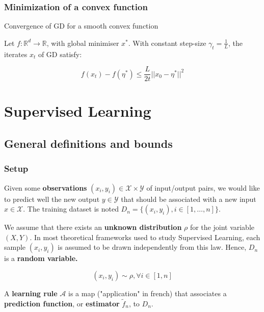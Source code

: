 \documentclass[
10pt, %
a4paper, %
oneside, %
headinclude,footinclude, %
BCOR5mm, %
]{scrartcl}
\begin{document}
\subsubsection{\large\color{Periwinkle}Minimization of a convex function}

\begin{theorem}{Convergence of GD for a smooth convex function}

    Let $f: \mathbb{R}^d\rightarrow \mathbb{R} $, with global minimiser $x^*$.
    With constant step-size $\gamma_t = \frac{1}{L} $, the iterates $x_t$ of GD
    satisfy:

    \begin{equation*}
	f(x_t)-f(\eta^*)\leq \frac{L}{2t} ||x_0-\eta^*||^2
    \end{equation*}
\end{theorem}


\section{\large\color{Blue}Supervised Learning}

\subsection{\large\color{MidnightBlue}General definitions and bounds}

\subsubsection{\large\color{Periwinkle}Setup}

Given some \textbf{{observations}} $(x_i,y_i)\in \mathcal{X} \times \mathcal{Y}$ of input/output pairs, we would like to predict well the new output $y\in \mathcal{Y} $ that should be associated with a new input $x\in \mathcal{X} $. The training dataset is noted $D_n = \{(x_i, y_i), i\in [1, \dots, n]\}$.

We assume that there exists an \textbf{{unknown distribution}} $\rho$ for the joint variable $(X,Y)$.  In most theoretical frameworks used to study Supervised Learning, each sample $(x_i,y_i)$ is assumed to be drawn independently from this law. Hence, $D_n$ is a \textbf{{random variable.}} 

\begin{equation}
    (x_i,y_i)\sim \rho, \forall i\in[1, n]
\end{equation}

A \textbf{{learning rule}} $ \mathcal{A} $ is a map ("application" in french) that associates a \textbf{{prediction function}}, or \textbf{{estimator}}  $ \tilde{f}_n$, to $D_n$.
\end{document}
